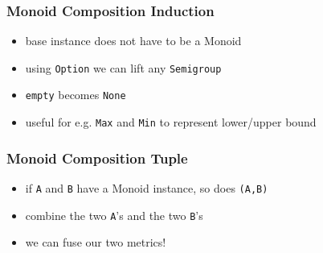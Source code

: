 \documentclass[aspectratio=169]{beamer}
\begin{document}
\begin{frame}
  \frametitle{Monoid Composition \textemdash{} Induction}
  \begin{itemize}
  \item base instance does not have to be a Monoid
  \item using \texttt{Option} we can lift any \texttt{Semigroup}
  \item \texttt{empty} becomes \texttt{None}
  \item useful for e.g. \texttt{Max} and \texttt{Min} to represent lower/upper bound
  \end{itemize}
\end{frame}

\begin{frame}
  \frametitle{Monoid Composition \textemdash{} Tuple}
  \begin{itemize}
  \item if \texttt{A} and \texttt{B} have a Monoid instance, so does \texttt{(A,B)}
  \item combine the two \texttt{A}'s and the two \texttt{B}'s
  \item we can fuse our two metrics!
  \end{itemize}
\end{frame}
\end{document}
